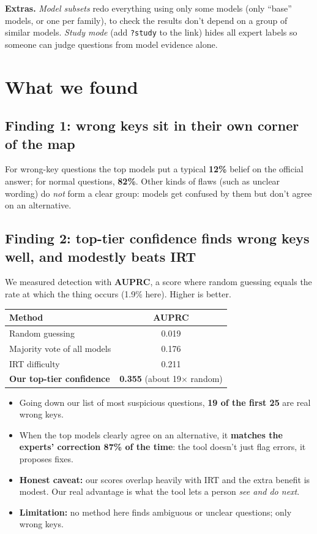 \documentclass[11pt]{article}
\begin{document}
\textbf{Extras.} \emph{Model subsets} redo everything using only some models (only ``base'' models,
or one per family), to check the results don't depend on a group of similar models. \emph{Study mode}
(add \texttt{?study} to the link) hides all expert labels so someone can judge questions from model
evidence alone.

\section{What we found}

\subsection*{Finding 1: wrong keys sit in their own corner of the map}
For wrong-key questions the top models put a typical \textbf{12\%} belief on the official answer;
for normal questions, \textbf{82\%}. Other kinds of flaws (such as unclear wording) do \emph{not} form
a clear group: models get confused by them but don't agree on an alternative.

\subsection*{Finding 2: top-tier confidence finds wrong keys well, and modestly beats IRT}
We measured detection with \textbf{AUPRC}, a score where random guessing equals the rate at which the
thing occurs (1.9\% here). Higher is better.

\begin{center}\small
\begin{tabular}{@{}lc@{}}
\toprule
Method & AUPRC \\
\midrule
Random guessing & 0.019 \\
Majority vote of all models & 0.176 \\
IRT difficulty & 0.211 \\
\textbf{Our top-tier confidence} & \textbf{0.355} (about 19$\times$ random) \\
\bottomrule
\end{tabular}
\end{center}

\begin{itemize}
  \item Going down our list of most suspicious questions, \textbf{19 of the first 25} are real wrong keys.
  \item When the top models clearly agree on an alternative, it \textbf{matches the experts'
    correction 87\% of the time}: the tool doesn't just flag errors, it proposes fixes.
  \item \textbf{Honest caveat:} our scores overlap heavily with IRT and the extra benefit is modest.
    Our real advantage is what the tool lets a person \emph{see and do next}.
  \item \textbf{Limitation:} no method here finds ambiguous or unclear questions; only wrong keys.
\end{itemize}
\end{document}
